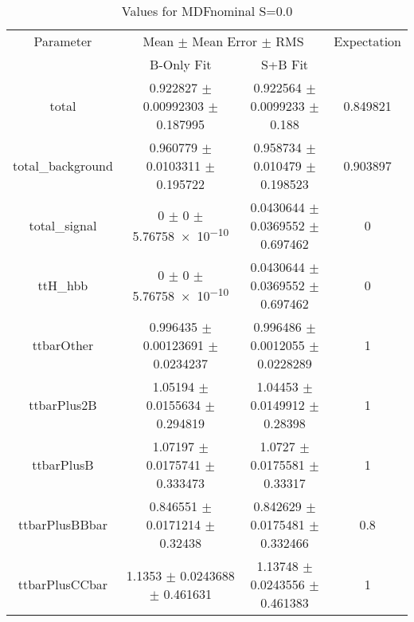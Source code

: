 \begin{table}
\centering
\caption{Values for MDFnominal S=0.0}
\begin{tabular}{cccc}
\toprule
Parameter & \multicolumn{2}{c}{Mean $\pm$ Mean Error $\pm$ RMS} & Expectation\\
 & B-Only Fit & S+B Fit & \\
\midrule
total & \num{0.922827} $\pm$ \num{0.00992303} $\pm$ \num{0.187995} & \num{0.922564} $\pm$ \num{0.0099233} $\pm$ \num{0.188} & \num{0.849821}\\
total\_background & \num{0.960779} $\pm$ \num{0.0103311} $\pm$ \num{0.195722} & \num{0.958734} $\pm$ \num{0.010479} $\pm$ \num{0.198523} & \num{0.903897}\\
total\_signal & \num{0} $\pm$ \num{0} $\pm$ \num{5.76758e-10} & \num{0.0430644} $\pm$ \num{0.0369552} $\pm$ \num{0.697462} & \num{0}\\
ttH\_hbb & \num{0} $\pm$ \num{0} $\pm$ \num{5.76758e-10} & \num{0.0430644} $\pm$ \num{0.0369552} $\pm$ \num{0.697462} & \num{0}\\
ttbarOther & \num{0.996435} $\pm$ \num{0.00123691} $\pm$ \num{0.0234237} & \num{0.996486} $\pm$ \num{0.0012055} $\pm$ \num{0.0228289} & \num{1}\\
ttbarPlus2B & \num{1.05194} $\pm$ \num{0.0155634} $\pm$ \num{0.294819} & \num{1.04453} $\pm$ \num{0.0149912} $\pm$ \num{0.28398} & \num{1}\\
ttbarPlusB & \num{1.07197} $\pm$ \num{0.0175741} $\pm$ \num{0.333473} & \num{1.0727} $\pm$ \num{0.0175581} $\pm$ \num{0.33317} & \num{1}\\
ttbarPlusBBbar & \num{0.846551} $\pm$ \num{0.0171214} $\pm$ \num{0.32438} & \num{0.842629} $\pm$ \num{0.0175481} $\pm$ \num{0.332466} & \num{0.8}\\
ttbarPlusCCbar & \num{1.1353} $\pm$ \num{0.0243688} $\pm$ \num{0.461631} & \num{1.13748} $\pm$ \num{0.0243556} $\pm$ \num{0.461383} & \num{1}\\
\bottomrule
\end{tabular}
\end{table}